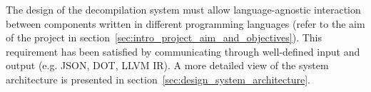 The design of the decompilation system must allow language-agnostic interaction between components written in different programming languages (refer to the aim of the project in section~\ref{sec:intro_project_aim_and_objectives}). This requirement has been satisfied by communicating through well-defined input and output (e.g. JSON, DOT, LLVM IR). A more detailed view of the system architecture is presented in section~\ref{sec:design_system_architecture}.






